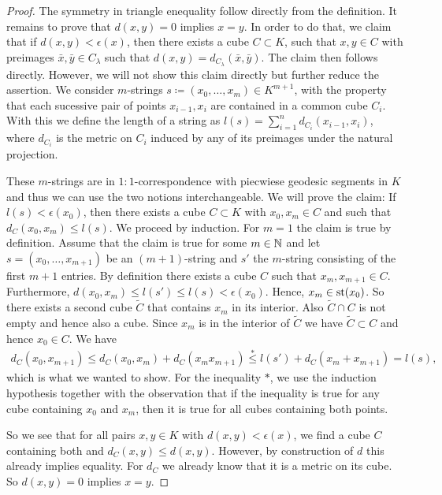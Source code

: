 \begin{proof}
  The symmetry in triangle enequality follow directly from the definition. It remains to prove that \(d(x,y) = 0\) implies \(x = y\). In order to do that, we claim that if \(d(x,y) < \epsilon(x)\), then there exists a cube \(C \subset K\), such that \(x, y \in C\) with preimages \(\bar x, \bar y \in C_\lambda\) such that \(d(x,y) = d_{C_\lambda}(\bar x,\bar y)\). The claim then follows directly. However, we will not show this claim directly but further reduce the assertion. We consider \(m\)-strings \(s \coloneqq (x_0, \dots, x_m) \in K^{m+1}\), with the property that each sucessive pair of points \(x_{i-1}, x_i\) are contained in a common cube \(C_i\). With this we define the length of a string as \(l(s) = \sum_{i=1}^n d_{C_i}(x_{i-1}, x_i)\), where \(d_{C_i}\) is the metric on \(C_i\) induced by any of its preimages under the natural projection.

  These \(m\)-strings are in \(1:1\)-correspondence with piecwiese geodesic segments in \(K\) and thus we can use the two notions interchangeable. We will prove the claim: If \(l(s) < \epsilon(x_0)\), then there exists a cube \(C \subset K\) with \(x_0, x_m \in C\) and such that \(d_C(x_0, x_m) \leq l(s)\). We proceed by induction. For \(m=1\) the claim is true by definition. Assume that the claim is true for some \(m \in \mathbb{N}\) and let \(s = (x_0, \dots, x_{m+1})\) be an \((m+1)\)-string and \(s'\) the \(m\)-string consisting of the first \(m+1\) entries. By definition there exists a cube \(C\) such that \(x_m, x_{m+1} \in C\). Furthermore, \(d(x_0, x_m) \leq l(s') \leq l(s) < \epsilon(x_0)\). Hence, \(x_m \in \operatorname{st}(x_0)\). So there exists a second cube \(\tilde C\) that contains \(x_m\) in its interior. Also \(\tilde C \cap C\) is not empty and hence also a cube. Since \(x_m\) is in the interior of \(\tilde C\) we have \(\tilde C \subset C\) and hence \(x_0 \in C\). We have
  \begin{align*}
    d_C(x_0, x_{m+1}) \leq d_C(x_0, x_m) + d_C(x_m x_{m+1}) \stackrel{\ast}{\leq} l(s') + d_C(x_m + x_{m+1}) = l(s),
  \end{align*}
  which is what we wanted to show. For the inequality \(\ast\), we use the induction hypothesis together with the observation that if the inequality is true for any cube containing \(x_0\) and \(x_m\), then it is true for all cubes containing both points.

  So we see that for all pairs \(x,y \in K\) with \(d(x,y) < \epsilon(x)\), we find a cube \(C\) containing both and \(d_C(x,y) \leq d(x,y)\). However, by construction of \(d\) this already implies equality. For \(d_C\) we already know that it is a metric on its cube. So \(d(x,y) = 0\) implies \(x = y\).
\end{proof}

